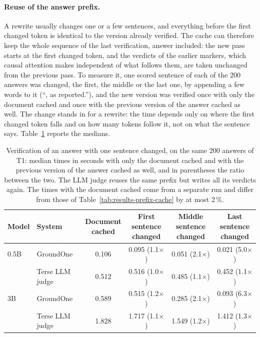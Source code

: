 \paragraph{Reuse of the answer prefix.} A rewrite usually changes one or a few sentences, and everything before the
first changed token is identical to the version already verified. The cache can therefore keep the whole sequence of the
last verification, answer included: the new pass starts at the first changed token, and the verdicts of the earlier
markers, which causal attention makes independent of what follows them, are taken unchanged from the previous pass. To
measure it, one scored sentence of each of the 200 answers was changed, the first, the middle or the last one, by
appending a few words to it (``, as reported.''), and the new version was verified once with only the document cached
and once with the previous version of the answer cached as well. The change stands in for a rewrite: the time depends
only on where the first changed token falls and on how many tokens follow it, not on what the sentence says.
Table~\ref{tab:results-answer-prefix} reports the medians.

\begin{table}[htbp]
\centering
\caption{Verification of an answer with one sentence changed, on the same 200 answers of T1: median times in seconds
with only the document cached and with the previous version of the answer cached as well, and in parentheses the ratio
between the two. The LLM judge reuses the same prefix but writes all its verdicts again. The times with the document cached come from a separate run and differ from those of Table~\ref{tab:results-prefix-cache} by at most 2\,\%.}
\label{tab:results-answer-prefix}
\small
\setlength{\tabcolsep}{4pt}
\begin{tabular}{llcccc}
\toprule
Model & System & \makecell{Document\\cached} & \makecell{First sentence\\changed} & \makecell{Middle sentence\\changed} & \makecell{Last sentence\\changed} \\
\midrule
0.5B & GroundOne & 0.106 & 0.095 (1.1$\times$) & 0.051 (2.1$\times$) & 0.021 (5.0$\times$) \\
 & Terse LLM judge & 0.512 & 0.516 (1.0$\times$) & 0.485 (1.1$\times$) & 0.452 (1.1$\times$) \\
\midrule
3B & GroundOne & 0.589 & 0.515 (1.2$\times$) & 0.285 (2.1$\times$) & 0.093 (6.3$\times$) \\
 & Terse LLM judge & 1.828 & 1.717 (1.1$\times$) & 1.549 (1.2$\times$) & 1.412 (1.3$\times$) \\
\bottomrule
\end{tabular}
\end{table}

